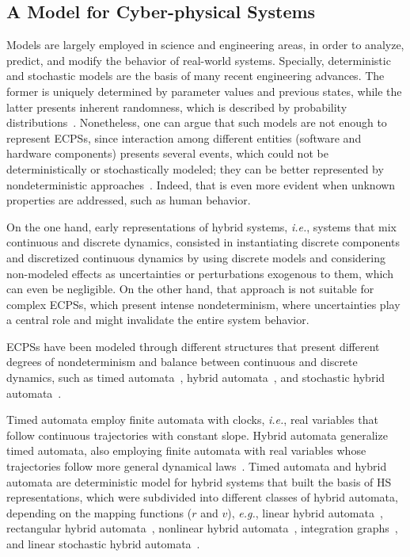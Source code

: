 \documentclass[format=acmsmall, review=false, screen=true]{acmart}
\begin{document}
\subsection{A Model for Cyber-physical Systems}
\label{ssec:model}

Models are largely employed in science and engineering areas, in order to analyze, predict, and modify the behavior of real-world systems. Specially, deterministic and stochastic models are the basis of many recent engineering advances. The former is uniquely determined by parameter values and previous states, while the latter presents inherent randomness, which is described by probability distributions~\cite{stochmodel}. Nonetheless, one can argue that such models are not enough to represent ECPSs, since interaction among different entities (software and hardware components) presents several events, which could not be deterministically or stochastically modeled; they can be better represented by nondeterministic approaches~\cite{leeCPS2}. Indeed, that is even more evident when unknown properties are addressed, such as human behavior.

On the one hand, early representations of hybrid systems, {\it i.e.}, systems that mix continuous and discrete dynamics, consisted in instantiating discrete components and discretized continuous dynamics by using discrete models and considering non-modeled effects as uncertainties or perturbations exogenous to them, which can even be negligible. On the other hand, that approach is not suitable for complex ECPSs, which present intense nondeterminism, where uncertainties play a central role and might invalidate the entire system behavior.

ECPSs have been modeled through different structures that present different degrees of nondeterminism and balance between continuous and discrete dynamics, such as timed automata~\cite{Alur94}, hybrid automata~\cite{Alur93,Henzinger95}, and stochastic hybrid automata~\cite{Julius09,Ghosh05,Pola03}.

Timed automata employ finite automata with clocks, {\it i.e.}, real variables that follow continuous trajectories with constant slope. Hybrid automata generalize timed automata, also employing finite automata with real variables whose trajectories follow more general dynamical laws~\cite{Henzinger95}.  Timed automata and hybrid automata are deterministic model for hybrid systems that built the basis of HS representations, which were subdivided into different classes of hybrid automata, depending on the mapping functions ($r$ and $v$), {\it e.g.}, linear hybrid automata~\cite{Lafferriere99}, rectangular hybrid automata~\cite{Puri94,Henzinger95}, nonlinear hybrid automata~\cite{Henzinger95NL,Broucke1997}, integration graphs~\cite{Kesten1993}, and linear stochastic hybrid automata~\cite{Julius09}. 
\end{document}
